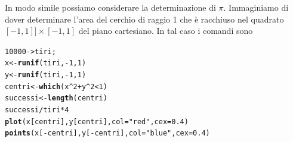 \documentclass[onecolumn,11pt]{book}\usepackage[]{graphicx}\usepackage[]{color}
\makeatletter
\newcommand{\hlnum}[1]{\textcolor[rgb]{0.686,0.059,0.569}{#1}}%
\newcommand{\hlstr}[1]{\textcolor[rgb]{0.192,0.494,0.8}{#1}}%
\newcommand{\hlopt}[1]{\textcolor[rgb]{0,0,0}{#1}}%
\newcommand{\hlstd}[1]{\textcolor[rgb]{0.345,0.345,0.345}{#1}}%
\newcommand{\hlkwb}[1]{\textcolor[rgb]{0.69,0.353,0.396}{#1}}%
\newcommand{\hlkwc}[1]{\textcolor[rgb]{0.333,0.667,0.333}{#1}}%
\newcommand{\hlkwd}[1]{\textcolor[rgb]{0.737,0.353,0.396}{\textbf{#1}}}%
\newenvironment{kframe}{%
 \def\at@end@of@kframe{}%
 \ifinner\ifhmode%
  \def\at@end@of@kframe{\end{minipage}}%
  \begin{minipage}{\columnwidth}%
 \fi\fi%
 \def\FrameCommand##1{\hskip\@totalleftmargin \hskip-\fboxsep
 \colorbox{shadecolor}{##1}\hskip-\fboxsep
     \hskip-\linewidth \hskip-\@totalleftmargin \hskip\columnwidth}%
 \MakeFramed {\advance\hsize-\width
   \@totalleftmargin\z@ \linewidth\hsize
   \@setminipage}}%
 {\par\unskip\endMakeFramed%
 \at@end@of@kframe}
\newenvironment{knitrout}{}{} %
\makeatother
\begin{document}
In modo simile possiamo considerare la determinazione di $\pi$. Immaginiamo di dover determinare l'area del cerchio di raggio 1 che \`e racchiuso nel quadrato $[-1,1]]\times[-1,1]$ del piano cartesiano.
In tal caso i comandi sono
\begin{knitrout}
\color{fgcolor}\begin{kframe}
\begin{alltt}
\hlnum{10000}\hlkwb{->}\hlstd{tiri;}
\hlstd{x}\hlkwb{<-}\hlkwd{runif}\hlstd{(tiri,}\hlopt{-}\hlnum{1}\hlstd{,}\hlnum{1}\hlstd{)}
\hlstd{y}\hlkwb{<-}\hlkwd{runif}\hlstd{(tiri,}\hlopt{-}\hlnum{1}\hlstd{,}\hlnum{1}\hlstd{)}
\hlstd{centri}\hlkwb{<-}\hlkwd{which}\hlstd{(x}\hlopt{^}\hlnum{2}\hlopt{+}\hlstd{y}\hlopt{^}\hlnum{2}\hlopt{<}\hlnum{1}\hlstd{)}
\hlstd{successi}\hlkwb{<-}\hlkwd{length}\hlstd{(centri)}
\hlstd{successi}\hlopt{/}\hlstd{tiri}\hlopt{*}\hlnum{4}
\hlkwd{plot}\hlstd{(x[centri],y[centri],}\hlkwc{col}\hlstd{=}\hlstr{"red"}\hlstd{,}\hlkwc{cex}\hlstd{=}\hlnum{0.4}\hlstd{)}
\hlkwd{points}\hlstd{(x[}\hlopt{-}\hlstd{centri],y[}\hlopt{-}\hlstd{centri],} \hlkwc{col}\hlstd{=}\hlstr{"blue"}\hlstd{,}\hlkwc{cex}\hlstd{=}\hlnum{0.4}\hlstd{)}
\end{alltt}
\end{kframe}
\end{knitrout}
\end{document}
